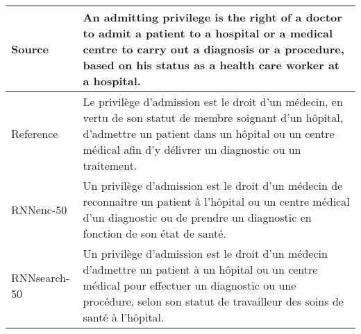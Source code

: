 \begin{table}[htp]
    \begin{minipage}{0.99\textwidth}
        \small
        \centering
        \begin{tabular}{p{1.9cm} | p{12cm}}
\hline Source & An admitting privilege is the right of a doctor to admit a patient to a hospital or a medical centre to carry out a diagnosis or a procedure, based on his status as a health care worker at a hospital.
\\
\hline Reference & Le privilège d'admission est le droit d'un m\'edecin, en vertu de son statut de membre soignant d'un h\^opital, d'admettre un patient dans un h\^opital ou un centre m\'edical afin d'y d\'elivrer un diagnostic ou un traitement.
\\
\hline RNNenc-50 & Un privilège d'admission est le droit d'un m\'edecin de reconnaître un patient à l'h\^opital ou un centre m\'edical d'un diagnostic ou de prendre un diagnostic en fonction de son \'etat de sant\'e.
\\
\hline RNNsearch-50 & Un privilège d'admission est le droit d'un m\'edecin d'admettre un patient à un h\^opital ou un centre m\'edical pour effectuer un diagnostic ou une proc\'edure, selon son statut de travailleur des soins de sant\'e à l'h\^opital.
\\

\end{tabular}
\end{minipage}
\end{table}
